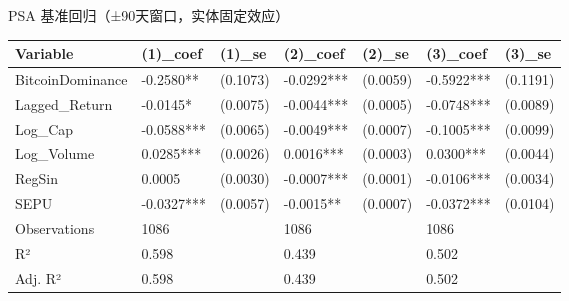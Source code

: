 \caption{PSA 基准回归（±90天窗口，实体固定效应）}
\begin{tabular}{lllllll}
\toprule
Variable & (1)_coef & (1)_se & (2)_coef & (2)_se & (3)_coef & (3)_se \\
\midrule
BitcoinDominance & -0.2580** & (0.1073) & -0.0292*** & (0.0059) & -0.5922*** & (0.1191) \\
Lagged_Return & -0.0145* & (0.0075) & -0.0044*** & (0.0005) & -0.0748*** & (0.0089) \\
Log_Cap & -0.0588*** & (0.0065) & -0.0049*** & (0.0007) & -0.1005*** & (0.0099) \\
Log_Volume & 0.0285*** & (0.0026) & 0.0016*** & (0.0003) & 0.0300*** & (0.0044) \\
RegSin & 0.0005 & (0.0030) & -0.0007*** & (0.0001) & -0.0106*** & (0.0034) \\
SEPU & -0.0327*** & (0.0057) & -0.0015** & (0.0007) & -0.0372*** & (0.0104) \\
Observations & 1086 &  & 1086 &  & 1086 &  \\
R² & 0.598 &  & 0.439 &  & 0.502 &  \\
Adj. R² & 0.598 &  & 0.439 &  & 0.502 &  \\
\bottomrule
\end{tabular}
